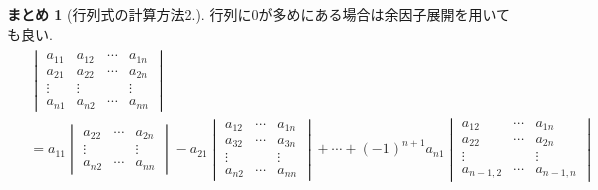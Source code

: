 \documentclass[dvipdfmx,a4paper,11pt]{article} %
\theoremstyle{definition}
\newtheorem{suma}[thm]{まとめ}
\begin{document}
\begin{tcolorbox}[
    colback = white,
    colframe = green!35!black,
    fonttitle = \bfseries,
    breakable = true]
    \begin{suma}[行列式の計算方法2.]
    行列に0が多めにある場合は余因子展開を用いても良い.
    \begin{align*}
\begin{split}
&\begin{vmatrix}
a_{11} & a_{12} & \cdots & a_{1n} \\
a_{21} & a_{22} & \cdots & a_{2n} \\
\vdots & \vdots & & \vdots \\
a_{n1} & a_{n2} & \cdots & a_{nn}
\end{vmatrix}\\
&=
a_{11} 
\begin{vmatrix}
a_{22} & \cdots & a_{2n} \\
\vdots & & \vdots \\
a_{n2} & \cdots & a_{nn}
\end{vmatrix}
- a_{21}
\begin{vmatrix}
a_{12} & \cdots & a_{1n} \\
a_{32} & \cdots & a_{3n} \\
\vdots & & \vdots \\
a_{n2} & \cdots & a_{nn}
\end{vmatrix}
+ \cdots + (-1)^{n+1} a_{n1}
\begin{vmatrix}
a_{12} & \cdots & a_{1n} \\
a_{22} & \cdots & a_{2n} \\
\vdots & & \vdots \\
a_{n-1,2} & \cdots & a_{n-1,n}
\end{vmatrix}
\end{split}
\end{align*}
\end{suma}
\end{tcolorbox}
\end{document}

